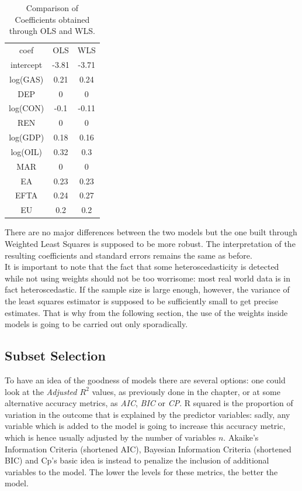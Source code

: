 \documentclass{book}
\begin{document}
\bigskip
\begin{table}[H]
\begin{center}
\begin{tabular}{|c|c|c|}
\hline
\rowcolor{maroon} \multicolumn{3}{|c|}{Coefficients Comparison}\\
\hline
coef&OLS&WLS\\
\hline
intercept&-3.81&-3.71\\
log(GAS)&0.21&0.24\\
DEP&0&0\\
log(CON)&-0.1&-0.11\\
REN&0&0\\
log(GDP)&0.18&0.16\\
log(OIL)&0.32&0.3\\
MAR&0&0\\
EA&0.23&0.23\\
EFTA&0.24&0.27\\
EU&0.2&0.2\\
\hline
\end{tabular}
\caption{Comparison of Coefficients obtained through OLS and WLS.}
\end{center}
\end{table}
\bigskip

There are no major differences between the two models but the one built through Weighted Least Squares is supposed to be more robust. The interpretation of the resulting coefficients and standard errors remains the same as before.\\

It is important to note that the fact that some heteroscedasticity is detected while not using weights should not be too worrisome: most real world data is in fact heteroscedastic. If the sample size is large enough, however, the variance of the least squares estimator is supposed to be sufficiently small to get precise estimates. That is why from the following section, the use of the weights inside models is going to be carried out only sporadically.

\subsection{Subset Selection}

To have an idea of the goodness of models there are several options: one could look at the \textit{Adjusted $R^{2}$} values, as previously done in the chapter, or at some alternative accuracy metrics, as \textit{AIC}, \textit{BIC} or \textit{CP}. R squared is the proportion of variation in the outcome that is explained by the predictor variables: sadly, any variable which is added to the model is going to increase this accuracy metric, which is hence usually adjusted by the number of variables $n$. Akaike's Information Criteria (shortened AIC), Bayesian Information Criteria (shortened BIC) and Cp's basic idea is instead to penalize the inclusion of additional variables to the model. The lower the levels for these metrics, the better the model.\\
\end{document}
